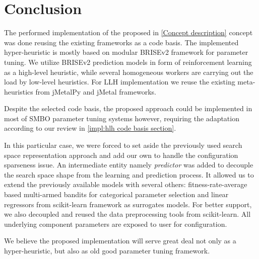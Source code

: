 \section{Conclusion}
The performed implementation of the proposed in \cref{Concept description} concept was done reusing the existing frameworks as a code basis. The implemented hyper-heuristic is mostly based on modular BRISEv2 framework for parameter tuning. We utilize BRISEv2 prediction models in form of reinforcement learning as a high-level heuristic, while several homogeneous workers are carrying out the load by low-level heuristics. For LLH implementation we reuse the existing meta-heuristics from jMetalPy and jMetal frameworks.

Despite the selected code basis, the proposed approach could be implemented in most of SMBO parameter tuning systems however, requiring the adaptation according to our review in \cref{impl:hlh code basis section}.

In this particular case, we were forced to set aside the previously used search space representation approach and add our own to handle the configuration sparseness issue. An intermediate entity namely \emph{predictor} was added to decouple the search space shape from the learning and prediction process. It allowed us to extend the previously available models with several others: fitness-rate-average based multi-armed bandits for categorical parameter selection and linear regressors from scikit-learn framework as surrogates models. For better support, we also decoupled and reused the data preprocessing tools from scikit-learn. All underlying component parameters are exposed to user for configuration.

We believe the proposed implementation will serve great deal not only as a hyper-heuristic, but also as old good parameter tuning framework.